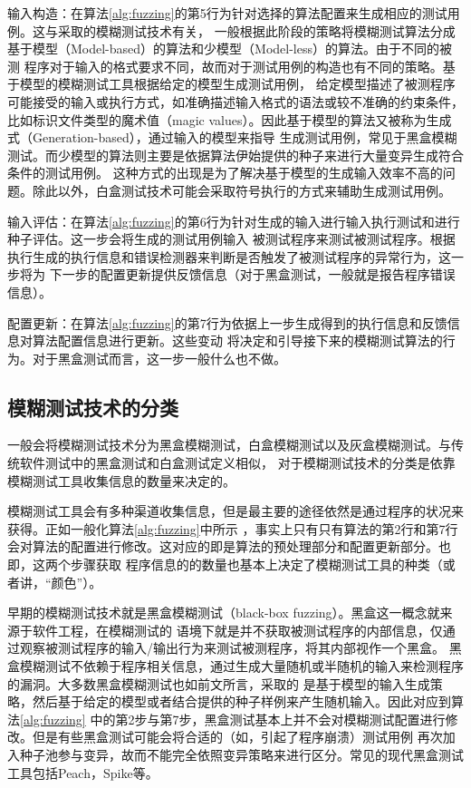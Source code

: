 \documentclass[bachelor]{njupthesis}
\begin{document}
输入构造：在算法\ref{alg:fuzzing}的第5行为针对选择的算法配置来生成相应的测试用例。这与采取的模糊测试技术有关，
一般根据此阶段的策略将模糊测试算法分成基于模型（Model-based）的算法和少模型（Model-less）的算法。由于不同的被测
程序对于输入的格式要求不同，故而对于测试用例的构造也有不同的策略。基于模型的模糊测试工具根据给定的模型生成测试用例，
给定模型描述了被测程序可能接受的输入或执行方式，如准确描述输入格式的语法或较不准确的约束条件，
比如标识文件类型的魔术值（magic values）。因此基于模型的算法又被称为生成式（Generation-based），通过输入的模型来指导
生成测试用例，常见于黑盒模糊测试。而少模型的算法则主要是依据算法伊始提供的种子来进行大量变异生成符合条件的测试用例。
这种方式的出现是为了解决基于模型的生成输入效率不高的问题。除此以外，白盒测试技术可能会采取符号执行的方式来辅助生成测试用例。

输入评估：在算法\ref{alg:fuzzing}的第6行为针对生成的输入进行输入执行测试和进行种子评估。这一步会将生成的测试用例输入
被测试程序来测试被测试程序。根据执行生成的执行信息和错误检测器来判断是否触发了被测试程序的异常行为，这一步将为
下一步的配置更新提供反馈信息（对于黑盒测试，一般就是报告程序错误信息）。

配置更新：在算法\ref{alg:fuzzing}的第7行为依据上一步生成得到的执行信息和反馈信息对算法配置信息进行更新。这些变动
将决定和引导接下来的模糊测试算法的行为。对于黑盒测试而言，这一步一般什么也不做。

\subsection{模糊测试技术的分类}
一般会将模糊测试技术分为黑盒模糊测试，白盒模糊测试以及灰盒模糊测试。与传统软件测试中的黑盒测试和白盒测试\cite{myers2011art}定义相似，
对于模糊测试技术的分类是依靠模糊测试工具收集信息的数量来决定的\cite{manes2019art}。

模糊测试工具会有多种渠道收集信息，但是最主要的途径依然是通过程序的状况来获得。正如一般化算法\ref{alg:fuzzing}中所示
，事实上只有只有算法的第2行和第7行会对算法的配置进行修改。这对应的即是算法的预处理部分和配置更新部分。也即，这两个步骤获取
程序信息的的数量也基本上决定了模糊测试工具的种类（或者讲，“颜色”）。

早期的模糊测试技术就是黑盒模糊测试\cite{beizer1995black}（black-box fuzzing）。黑盒这一概念就来源于软件工程，在模糊测试的
语境下就是并不获取被测试程序的内部信息，仅通过观察被测试程序的输入/输出行为来测试被测程序，将其内部视作一个黑盒。
黑盒模糊测试不依赖于程序相关信息，通过生成大量随机或半随机的输入来检测程序的漏洞。大多数黑盒模糊测试也如前文所言，采取的
是基于模型的输入生成策略，然后基于给定的模型或者结合提供的种子样例来产生随机输入。因此对应到算法\ref{alg:fuzzing}
中的第2步与第7步，黑盒测试基本上并不会对模糊测试配置进行修改。但是有些黑盒测试可能会将合适的（如，引起了程序崩溃）测试用例
再次加入种子池参与变异，故而不能完全依照变异策略来进行区分。常见的现代黑盒测试工具包括Peach\cite{Peach}，Spike\cite{Spike}等。
\end{document}
